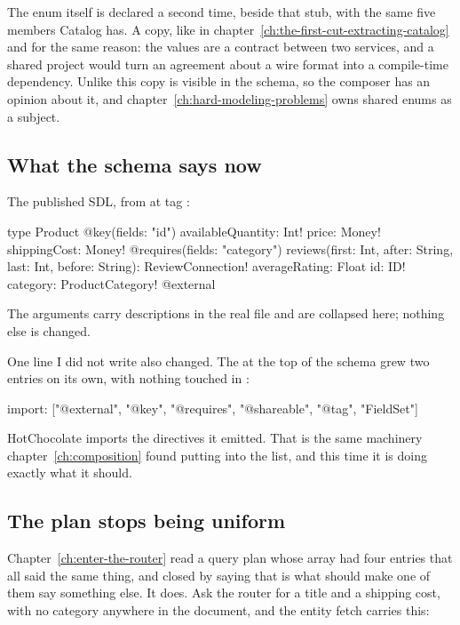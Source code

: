 The enum itself is declared a second time, beside that stub, with the same five
members Catalog has. A copy, like  in
chapter~\ref{ch:the-first-cut-extracting-catalog} and for the same reason: the
values are a contract between two services, and a shared project would turn an
agreement about a wire format into a compile-time dependency. Unlike
 this copy is visible in the schema, so the composer has an
opinion about it, and chapter~\ref{ch:hard-modeling-problems} owns shared enums
as a subject.

\subsection*{What the schema says now}

%
The published SDL, from  at tag :

\begin{graphqlsdl}[fontsize=\footnotesize]
type Product @key(fields: "id") {
  availableQuantity: Int!
  price: Money!
  shippingCost: Money! @requires(fields: "category")
  reviews(first: Int, after: String, last: Int, before: String): ReviewConnection!
  averageRating: Float
  id: ID!
  category: ProductCategory! @external
}
\end{graphqlsdl}

The  arguments carry descriptions in the real file and are
collapsed here; nothing else is changed.

One line I did not write also changed. The  at the top of the
schema grew two entries on its own, with nothing touched in :

\begin{graphqlsdl}[fontsize=\footnotesize]
import: ["@external", "@key", "@requires", "@shareable", "@tag", "FieldSet"]
\end{graphqlsdl}

HotChocolate imports the directives it emitted. That is the same machinery
chapter~\ref{ch:composition} found putting  into the list, and
this time it is doing exactly what it should.

\subsection*{The plan stops being uniform}

%
Chapter~\ref{ch:enter-the-router} read a query plan whose 
array had four entries that all said the same thing, and closed by saying that
 is what should make one of them say something else. It does.
Ask the router for a title and a shipping cost, with no category anywhere in
the document, and the entity fetch carries this:

